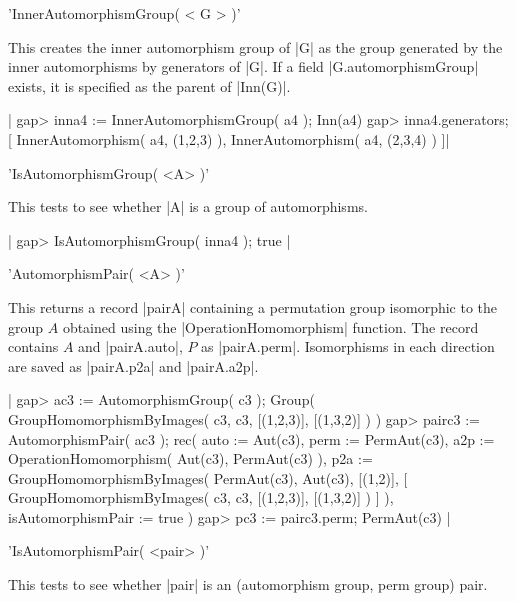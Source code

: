 {%
%

'InnerAutomorphismGroup( < G > )'

This creates the inner automorphism group of |G| as the group generated
by the inner automorphisms by generators of |G|.
If a field |G.automorphismGroup| exists,
it is specified as the parent of |Inn(G)|.

|    gap> inna4 := InnerAutomorphismGroup( a4 );
    Inn(a4)
    gap> inna4.generators;
    [ InnerAutomorphism( a4, (1,2,3) ), InnerAutomorphism( a4, (2,3,4) ) ]|

%

'IsAutomorphismGroup( <A> )'

This tests to see whether |A| is a group of automorphisms.

|    gap> IsAutomorphismGroup( inna4 );
    true |

%

'AutomorphismPair( <A> )'

This returns a record |pairA| containing a permutation group isomorphic 
to the group $A$ obtained using the |OperationHomomorphism| function. 
The record contains $A$ and |pairA.auto|,  $P$ as |pairA.perm|.
Isomorphisms in each direction are saved as  |pairA.p2a| and |pairA.a2p|.

|    gap> ac3 := AutomorphismGroup( c3 );
    Group( GroupHomomorphismByImages( c3, c3, [(1,2,3)], [(1,3,2)] ) )
    gap> pairc3 := AutomorphismPair( ac3 );
    rec(
      auto := Aut(c3),
      perm := PermAut(c3),
      a2p := OperationHomomorphism( Aut(c3), PermAut(c3) ),
      p2a := GroupHomomorphismByImages( PermAut(c3), Aut(c3), [(1,2)], 
        [ GroupHomomorphismByImages( c3, c3, [(1,2,3)], [(1,3,2)] ) ] ),
      isAutomorphismPair := true )
    gap> pc3 := pairc3.perm;
    PermAut(c3)  |

%

'IsAutomorphismPair( <pair> )'

This tests to see whether |pair| is an (automorphism group, perm group) pair.

}
